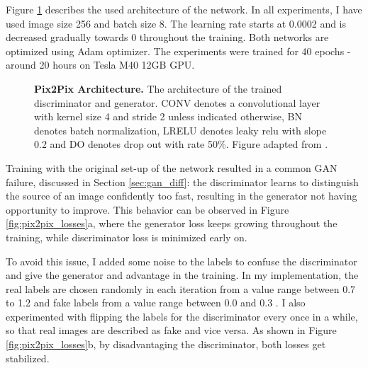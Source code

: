 \documentclass[12pt]{report}
\begin{document}
Figure \ref{fig:pix2pix_arch} describes the used architecture of the network. In all experiments, I have used image size 256 and batch size 8. The learning rate starts at 0.0002 and is decreased gradually towards 0 throughout the training. Both networks are optimized using Adam optimizer. The experiments were trained for 40 epochs - around 20 hours on Tesla M40 12GB GPU.

\begin{figure}[h]
\centering
{}\vspace{.5cm}
\caption{\label{fig:pix2pix_arch} \textbf{Pix2Pix Architecture.} The architecture of the trained  discriminator and generator. CONV denotes a convolutional layer with kernel size 4 and stride 2 unless indicated otherwise, BN denotes batch normalization, LRELU denotes leaky relu with slope 0.2 and DO denotes drop out with rate 50\%. Figure adapted from \cite{hesse_image--image_2017}.}
\end{figure}

Training with the original set-up of the network resulted in a common GAN failure, discussed in Section \ref{sec:gan_diff}: the discriminator learns to distinguish the source of an image confidently too fast, resulting in the generator not having opportunity to improve. This behavior can be observed in Figure \ref{fig:pix2pix_losses}a, where the generator loss keeps growing throughout the training, while discriminator loss is minimized early on.

To avoid this issue, I added some noise to the labels to confuse the discriminator and give the generator and advantage in the training. In my implementation, the real labels are chosen randomly in each iteration from a value range between 0.7 to 1.2 and fake labels from a value range between 0.0 and 0.3 \cite{chintala_starter_2018}. I also experimented with flipping the labels for the discriminator every once in a while, so that real images are described as fake and vice versa. As shown in Figure \ref{fig:pix2pix_losses}b, by disadvantaging the discriminator, both losses get stabilized.
\end{document}
